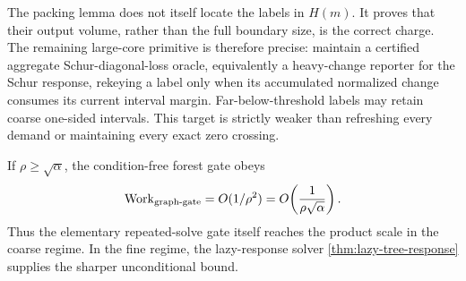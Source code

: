 The packing lemma does not itself locate the labels in $H(m)$.  It proves
that their output volume, rather than the full boundary size, is the correct
charge.  The remaining large-core primitive is therefore precise: maintain a
certified aggregate Schur-diagonal-loss oracle, equivalently a heavy-change
reporter for the Schur response, rekeying a label only when its accumulated
normalized change consumes its current interval margin.
Far-below-threshold labels may retain coarse one-sided intervals.  This target
is strictly weaker than refreshing every demand or maintaining every exact
zero crossing.

\begin{corollary}
\label{cor:coarse-tree-target}
If $\rho\geq\sqrt\alpha$, the condition-free forest gate obeys
\begin{equation}
 \operatorname{Work}_{\rm graph\text{-}gate}
 =O(1/\rho^2)
 =O\!\left(\frac1{\rho\sqrt\alpha}\right).
 \label{eq:coarse-tree-target}
\end{equation}
Thus the elementary repeated-solve gate itself reaches the product scale in
the coarse regime.  In the fine regime, the lazy-response solver
\cref{thm:lazy-tree-response} supplies the sharper unconditional bound.
\end{corollary}
